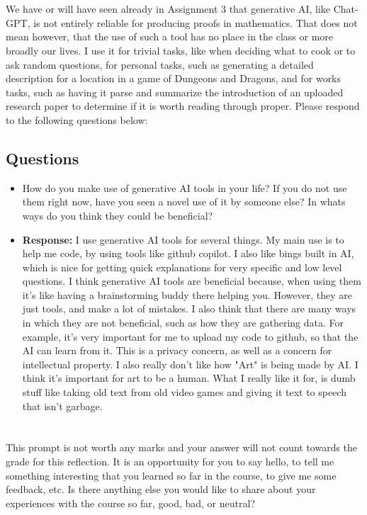 \documentclass{article}
\begin{document}
\section*{} 

We have or will have seen already in Assignment 3 that generative AI, like Chat-GPT, is not entirely reliable for producing proofs in mathematics. That does not
mean however, that the use of such a tool has no place in the class or more broadly
our lives. I use it for trivial tasks, like when deciding what to cook or to ask random questions, for personal tasks, such as generating a detailed description for a
location in a game of Dungeons and Dragons, and for works tasks, such as having it
parse and summarize the introduction of an uploaded research paper to determine
if it is worth reading through proper.
\newline
\newline
Please respond to the following questions below:
\subsection*{Questions}
\begin{itemize}
    \item[] How do you make use of generative AI tools in your life? If you do not use them
    right now, have you seen a novel use of it by someone else? In whats ways do you
    think they could be beneficial?
    \item[] \textbf{Response:} I use generative AI tools for several things. My main use is to help me code, by using tools like
    github copilot. I also like bings built in AI, which is nice for getting quick explanations for very specific and low level questions.
    I think generative AI tools are beneficial because, when using them it's like having a brainstorming buddy there helping you. However,
    they are just tools, and make a lot of mistakes. I also think that there are many ways in which they are not beneficial, such as how they are 
    gathering data. For example, it's very important for me to upload my code to github, so that the AI can learn from it. This is a privacy concern,
    as well as a concern for intellectual property. I also really don't like how "Art" is being made by AI. I think it's important for art to be a human.
    What I really like it for, is dumb stuff like taking old text from old video games and giving it text to speech that isn't garbage.
\end{itemize}
\section*{}
This prompt is not worth any marks and your answer will not count towards the
grade for this reflection. It is an opportunity for you to say hello, to tell me something interesting that you learned so far in the course, to give me some feedback,
etc.
\newline
\newline
Is there anything else you would like to share about your experiences with the course so far, good, bad, or neutral?
\end{document}
